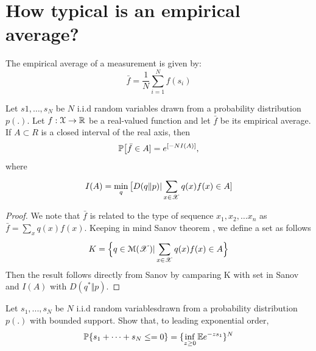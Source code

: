 \documentclass[letterpaper,english,12pt]{article}
\begin{document}
 \section{How typical is an empirical average?}
 The empirical average of a measurement is given by:
 \begin{equation}
     \bar{f} = \frac{1}{N}\sum_{i=1}^{N}f(s_i)
 \end{equation}
 \begin{cor}
 Let $s1,\dots ,s_N$ be $N$ i.i.d random variables drawn from a probability distribution $p(.)$. Let $f:\mathcal{X}\rightarrow \R$ be a real-valued  function and let $\bar{f}$ be its empirical average. If $A\subset R$ is a closed interval of the real axis, then 
 \begin{equation}
     \P\big[\bar{f}\in A]= e^{[-NI(A)]},
 \end{equation}
 where
 \begin{equation}
     I(A)=\min_q\big[D(q\Vert p)| \sum_{x\in \sX}^{} q(x)f(x) \in A]
 \end{equation}
 \end{cor}
 \begin{proof}
 We note that $\bar{f}$ is related to the type of sequence $x_1,x_2,\dots x_n$ as $\bar{f}=\sum_{x}^{}q(x)f(x)$. Keeping in mind Sanov theorem , we define a set as follows 
 \begin{equation}
     K= \Big\{ q\in \mathcal{M}(\sX)|\sum_{x\in \sX}^{} q(x)f(x) \in A \Big\}
 \end{equation}
 Then the result follows directly from Sanov by camparing K with set in Sanov and $I(A)$ with $D(q^* \Vert p)$.
 \end{proof}
 
 \begin{exmp}
 	Let $s_1,...,s_N$ be $N$ i.i.d random variablesdrawn from a probability distribution $p(.)$ with bounded support. Show that, to leading exponential order, 
   \begin{equation}
       \P \{s_1 + \dots + s_N \leq  = 0\} = \{ \inf_{z\geq 0} \E {e^{-zs_1}}  \}^N
   \end{equation}
     
 \end{exmp}
 
\end{document}
